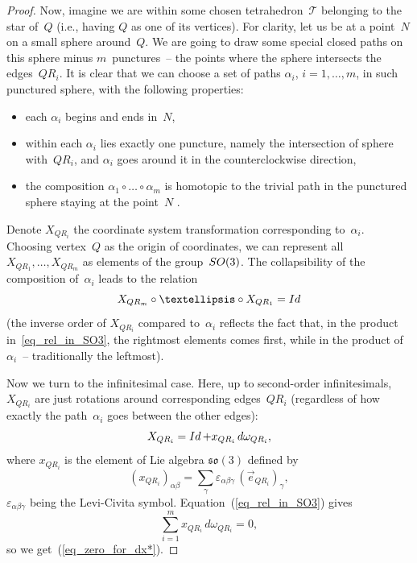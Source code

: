 \documentclass[11pt]{article}
\begin{document}
\begin{proof}
Now, imagine we are within some chosen tetrahedron~$\mathcal T$ belonging to the star of~$Q$ (i.e., having $Q$ as one of its vertices). For clarity, let us be at a point~$N$ on a small sphere around~$Q$. We are going to draw some special closed paths on this sphere minus $m$~punctures~-- the points where the sphere intersects the edges~$QR_i$. It is clear that we can choose a set of paths $\alpha_i$, $i=1,\dots,m$, in such punctured sphere, with the following properties:
\begin{itemize}
\itemsep=0pt
	\item each $\alpha_i$ begins and ends in~$N$,
	\item within each $\alpha_i$ lies exactly one puncture, namely the intersection of sphere with~$QR_i$, and $\alpha_i$ goes around it in the counterclockwise direction,
	\item the composition $\alpha_1 \circ \dots \circ \alpha_m$ is homotopic to the trivial path in the punctured sphere staying at the point~$N$ .	
\end{itemize}

Denote $X_{QR_i}$ the coordinate system transformation corresponding to~$\alpha_i$. Choosing vertex~$Q$ as the origin of coordinates, we can represent all $X_{QR_1}, \ldots, X_{QR_m}$ as elements of the group~${\rm SO}(3)$. The collapsibility of the composition of~$\alpha_i$ leads to the relation
\begin{equation}
X_{QR_m} \circ \dots \circ X_{QR_1} = \mathop{\rm Id}
\label{eq_rel_in_SO3}
\end{equation}
(the inverse order of $X_{QR_i}$ compared to~$\alpha_i$ ref\/lects the fact that, in the product in~\eqref{eq_rel_in_SO3}, the rightmost elements comes f\/irst, while in the product of~$\alpha_i$~-- traditionally the leftmost).

Now we turn to the inf\/initesimal case. Here, up to second-order inf\/initesimals, $X_{QR_i}$ are just rotations around corresponding edges~$QR_i$ (regardless of how exactly the path~$\alpha_i$ goes between the other edges):
\begin{displaymath}
X_{QR_i} = \mathop{\rm Id} + x_{QR_i}\, d\omega_{QR_i},
\end{displaymath}
where $x_{QR_i}$ is the element of Lie algebra $\mathfrak{so}(3)$ def\/ined by
\begin{displaymath}
(x_{QR_i})_{\alpha\beta} = \sum\limits_\gamma\varepsilon_{\alpha\beta\gamma}\, (\vec e_{QR_i})_\gamma ,
\end{displaymath}
$\varepsilon_{\alpha\beta\gamma}$ being the Levi-Civita symbol.
Equation~(\ref{eq_rel_in_SO3}) gives
\begin{displaymath}
\sum_{i=1}^m x_{QR_i}\, d\omega_{QR_i} = 0 ,
\end{displaymath}
so we get~(\ref{eq_zero_for_dx*}).
\end{proof}
\end{document}
